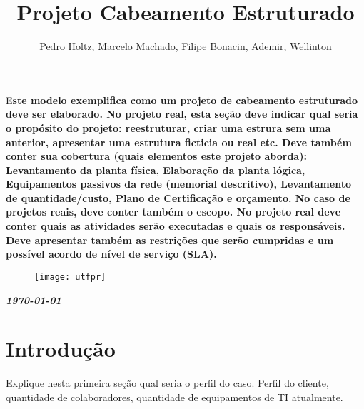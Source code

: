 \documentclass[	DIV=calc,%
							paper=a4,%
							fontsize=12pt,%
							onecolumn]{scrartcl}	 					%
\title{Projeto Cabeamento Estruturado}					%
\author{Pedro Holtz, Marcelo Machado, Filipe Bonacin, Ademir, Wellinton }  	%
\date{}																				%
\newcommand{\initial}[1]{%
     \lettrine[lines=3,lhang=0.3,nindent=0em]{
     				\color{DarkGoldenrod}
     				{\textsf{#1}}}{}}
\begin{document}
\maketitle
\thispagestyle{fancy} 	
\thispagestyle{empty}		%




\initial{E}\textbf{ste modelo exemplifica como um projeto de cabeamento estruturado deve ser elaborado. No projeto real,
	esta seção deve indicar qual seria o propósito do projeto: reestruturar, criar uma estrura sem uma anterior, apresentar uma estrutura ficticia ou real  etc. Deve também conter sua cobertura (quais elementos este projeto aborda): Levantamento da planta física, Elaboração da planta lógica, Equipamentos passivos da rede (memorial descritivo), Levantamento de quantidade/custo, Plano de Certificação e orçamento.
	No caso de projetos reais, deve conter também o escopo. No projeto real deve conter quais as atividades serão executadas e quais os responsáveis. Deve apresentar também as restrições que serão cumpridas e um possível acordo de nível de serviço (SLA).}

\begin{figure}
	\centering
	\texttt{[image: utfpr]}
\end{figure}

\vspace{3cm}
\centerline{\textit{\textbf{\today}}}

\clearpage
    \renewcommand*\listfigurename{Lista de figuras}
\listoffigures

\renewcommand*\listtablename{Lista de tabelas}
\listoftables




\clearpage
\renewcommand{\contentsname}{Sumário}
\tableofcontents
\clearpage

\section{Introdução}
Explique nesta primeira seção qual seria o perfil do caso. Perfil do cliente, quantidade de colaboradores, quantidade de equipamentos de TI atualmente.
\end{document}
